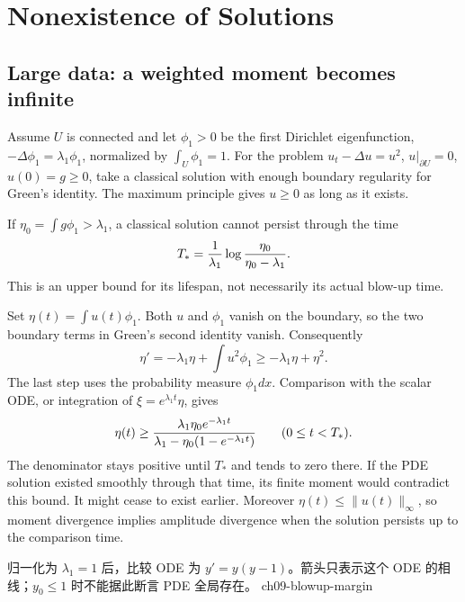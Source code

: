 \section{Nonexistence of Solutions}
\label{sec:9-4}
\Needspace{40mm}
\subsection{Large data: a weighted moment becomes infinite}
Assume $U$ is connected and let $\phi_1>0$ be the first Dirichlet
eigenfunction, $-\Delta\phi_1=\lambda_1\phi_1$, normalized by
$\int_U\phi_1=1$. For the problem $u_t-\Delta u=u^2$,
$u|_{\partial U}=0$, $u(0)=g\geq0$, take a classical solution with enough
boundary regularity for Green's identity. The maximum principle gives
$u\geq0$ as long as it exists.
\Needspace{50mm}
\begin{theorem}
If $\eta_0=\int g\phi_1>\lambda_1$, a classical solution cannot persist
through the time
\[
 T_*={1\over\lambda_1}\log{\eta_0\over\eta_0-\lambda_1}.
\]
This is an upper bound for its lifespan, not necessarily its actual blow-up time.
\end{theorem}
\begin{expandedproof}
Set $\eta(t)=\int u(t)\phi_1$. Both $u$ and $\phi_1$ vanish on the
boundary, so the two boundary terms in Green's second identity vanish.
Consequently
\[
 \eta'=-\lambda_1\eta+\int u^2\phi_1
 \geq-\lambda_1\eta+\eta^2.
\]
The last step uses the probability measure $\phi_1dx$. Comparison with
the scalar ODE, or integration of $\xi=e^{\lambda_1t}\eta$, gives
\[
 \eta(t)\geq {\lambda_1\eta_0e^{-\lambda_1t}
 \over\lambda_1-\eta_0(1-e^{-\lambda_1t})}\qquad(0\leq t<T_*).
\]
The denominator stays positive until $T_*$ and tends to zero there.
If the PDE solution existed smoothly through that time, its finite moment
would contradict this bound. It might cease to exist earlier. Moreover
$\eta(t)\leq\|u(t)\|_\infty$, so moment divergence implies amplitude
divergence when the solution persists up to the comparison time.
\end{expandedproof}
{归一化为 $\lambda_1=1$ 后，比较 ODE 为 $y'=y(y-1)$。箭头只表示这个 ODE 的相线；$y_0\leq1$ 时不能据此断言 PDE 全局存在。}
{ch09-blowup-margin}

\Needspace{40mm}

